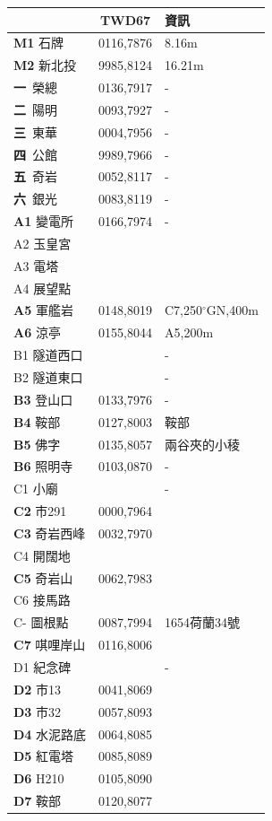 \documentclass{article}
\begin{document}
\begin{CJK*}{UTF8}{bkai}
\begin{multicols}{2}
\begin{tabular}{|l|c|l|}
	\hline
	&TWD67&資訊\\  
	\hline
	\textbf{M1} 石牌&0116,7876&8.16m\\
	\textbf{M2} 新北投&9985,8124&16.21m\\
	\hline
	\textbf{一}\ 榮總&0136,7917&-\\
	\textbf{二}\ 陽明&0093,7927&-\\
	\textbf{三}\ 東華&0004,7956&-\\
	\textbf{四}\ 公館&9989,7966&-\\
	\textbf{五}\ 奇岩&0052,8117&-\\
	\textbf{六}\ 銀光&0083,8119&-\\
	\hline
	\textbf{A1} 變電所&0166,7974&-\\
	A2 玉皇宮& &\\
	A3 電塔& &\\
	A4 展望點& &\\
	\textbf{A5} 軍艦岩&0148,8019&C7,250$^{\circ}$GN,400m\\
	\textbf{A6} 涼亭&0155,8044&A5,200m\\
	\hline
	B1 隧道西口& &-\\
	B2 隧道東口& &-\\
	\textbf{B3} 登山口&0133,7976&-\\
	\textbf{B4} 鞍部&0127,8003&鞍部\\
	\textbf{B5} 佛字&0135,8057&兩谷夾的小稜\\
	\textbf{B6} 照明寺&0103,0870&-\\
	\hline
	C1 小廟& &-\\
	\textbf{C2} 市291&0000,7964&\\
	\textbf{C3} 奇岩西峰&0032,7970&\\
	C4 開闊地& &\\
	\textbf{C5} 奇岩山&0062,7983&\\
	C6 接馬路& &\\
	C- 圖根點&0087,7994&1654荷蘭34號\\
	\textbf{C7} 唭哩岸山&0116,8006&\\
	\hline
	D1 紀念碑& &-\\
	\textbf{D2} 市13&0041,8069&\\
	\textbf{D3} 市32&0057,8093&\\
	\textbf{D4} 水泥路底&0064,8085&\\
	\textbf{D5} 紅電塔&0085,8089&\\
	\textbf{D6} H210&0105,8090&\\
	\textbf{D7} 鞍部&0120,8077&\\

\end{tabular}
\end{multicols}
\end{CJK*}
\end{document}
